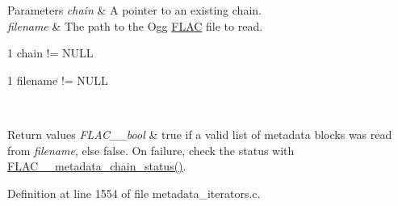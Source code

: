 \begin{DoxyParams}{Parameters}
{\em chain} & A pointer to an existing chain. \\
\hline
{\em filename} & The path to the Ogg \hyperlink{namespace_f_l_a_c}{F\+L\+AC} file to read.  
\begin{DoxyCode}
1 chain != NULL 
\end{DoxyCode}
 
\begin{DoxyCode}
1 filename != NULL 
\end{DoxyCode}
 \\
\hline
\end{DoxyParams}

\begin{DoxyRetVals}{Return values}
{\em F\+L\+A\+C\+\_\+\+\_\+bool} & {\ttfamily true} if a valid list of metadata blocks was read from {\itshape filename}, else {\ttfamily false}. On failure, check the status with \hyperlink{group__flac__metadata__level2_ga3d030e216a6517f23372bb76f0639127}{F\+L\+A\+C\+\_\+\+\_\+metadata\+\_\+chain\+\_\+status()}. \\
\hline
\end{DoxyRetVals}


Definition at line 1554 of file metadata\+\_\+iterators.\+c.

